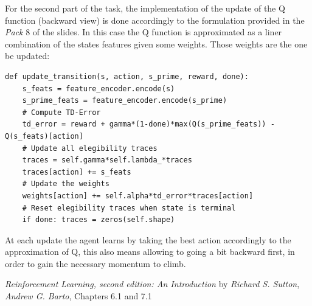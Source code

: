 \documentclass[10pt,a4paper]{article}
\begin{document}
\newpage
\noindent For the second part of the task, the implementation of the update of the Q function (backward view) is done accordingly to the formulation provided in the \textit{Pack} 8 of the slides. In this case the Q function is approximated as a liner combination of the states features given some weights. Those weights are the one be updated: 
\begin{lstlisting}
def update_transition(s, action, s_prime, reward, done):
    s_feats = feature_encoder.encode(s)
    s_prime_feats = feature_encoder.encode(s_prime)
    # Compute TD-Error
    td_error = reward + gamma*(1-done)*max(Q(s_prime_feats)) - Q(s_feats)[action]
    # Update all elegibility traces
    traces = self.gamma*self.lambda_*traces
    traces[action] += s_feats
    # Update the weights
    weights[action] += self.alpha*td_error*traces[action]
    # Reset elegibility traces when state is terminal
    if done: traces = zeros(self.shape)
\end{lstlisting}
At each update the agent learns by taking the best action accordingly to the approximation of Q, this also means allowing to going a bit backward first, in order to gain the necessary momentum to climb.
\newpage

\begin{thebibliography}{9}
    \emph{Reinforcement Learning, second edition: An Introduction} by \textit{Richard S. Sutton}, \textit{Andrew G. Barto}, Chapters 6.1 and 7.1 

\end{thebibliography}
\end{document}
